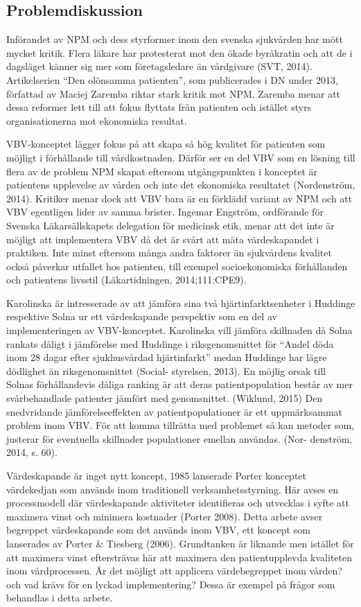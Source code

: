 \subsection{Problemdiskussion}

Införandet av NPM och dess styrformer inom den svenska sjukvården har mött mycket kritik. Flera läkare har protesterat mot den ökade byråkratin och att de i dagsläget känner sig mer som företagsledare än vårdgivare (SVT, 2014). Artikelserien “Den olönsamma patienten”, som publicerades i DN under 2013, författad av Maciej Zaremba riktar stark kritik mot NPM. Zaremba menar att dessa reformer lett till att fokus flyttats från patienten och istället styrs organisationerna mot ekonomiska resultat.
 
VBV-konceptet lägger fokus på att skapa så hög kvalitet för patienten som möjligt i förhållande till vårdkostnaden. Därför ser en del VBV som en lösning till flera av de problem NPM skapat eftersom utgångspunkten i konceptet är patientens upplevelse av vården och inte det ekonomiska resultatet (Nordenström, 2014). Kritiker menar dock att VBV bara är en förklädd variant av NPM och att VBV egentligen lider av samma brister. Ingemar Engström, ordförande för Svenska Läkarsällskapets delegation för medicinsk etik, menar att det inte är möjligt att implementera VBV då det är svårt att mäta värdeskapandet i praktiken. Inte minst eftersom många andra faktorer än sjukvårdens kvalitet också påverkar utfallet hos patienten, till exempel socioekonomiska förhållanden och patientens livsstil (Läkartidningen, 2014;111:CPE9).
 
Karolinska är intresserade av att jämföra sina två hjärtinfarktsenheter i Huddinge respektive Solna ur ett värdeskapande perspektiv som en del av implementeringen av VBV-konceptet. Karolinska vill jämföra skillnaden då Solna rankats dåligt i jämförelse med Huddinge i riksgenomsnittet för “Andel döda inom 28 dagar efter sjukhusvårdad hjärtinfarkt” medan Huddinge har lägre dödlighet än riksgenomsnittet (Social- styrelsen, 2013). En möjlig orsak till Solnas förhållandevis dåliga ranking är att deras patientpopulation består av mer svårbehandlade patienter jämfört med genomsnittet. (Wiklund, 2015) Den snedvridande jämförelseeffekten av patientpopulationer är ett uppmärksammat problem inom VBV. För att komma tillrätta med problemet så kan metoder som, justerar för eventuella skillnader populationer emellan användas. (Nor- denström, 2014, s. 60).

Värdeskapande är inget nytt koncept, 1985 lanserade Porter konceptet värdekedjan som används inom traditionell verksamhetsstyrning. Här avses en processmodell där värdeskapande aktiviteter identifieras och utvecklas i syfte att maximera vinst och minimera kostnader (Porter 2008). Detta arbete avser begreppet värdeskapande som det används inom VBV, ett koncept som lanserades av Porter \& Tiesberg (2006). Grundtanken är liknande men istället för att maximera vinst eftersträvas här att maximera den patientupplevda kvaliteten inom vårdprocessen. Är det möjligt att applicera värdebegreppet inom vården? och vad krävs för en lyckad implementering? Dessa är exempel på frågor som behandlas i detta arbete.

